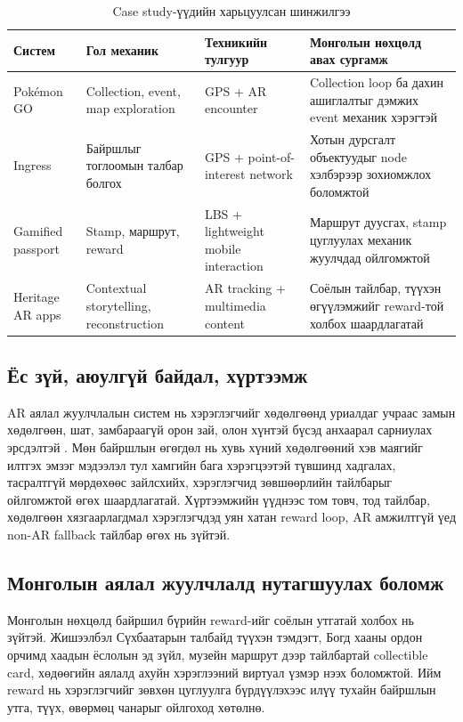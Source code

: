\begin{sloppy}
\begin{table}[H]
\centering
\caption{Case study-үүдийн харьцуулсан шинжилгээ}
\label{tab:case-studies}
\begin{tabular}{|p{3cm}|p{3cm}|p{3cm}|p{4cm}|}
\hline
\textbf{Систем} & \textbf{Гол механик} & \textbf{Техникийн тулгуур} & \textbf{Монголын нөхцөлд авах сургамж} \\ \hline
Pok\'emon GO & Collection, event, map exploration & GPS + AR encounter & Collection loop ба дахин ашиглалтыг дэмжих event механик хэрэгтэй \\ \hline
Ingress & Байршлыг тоглоомын талбар болгох & GPS + point-of-interest network & Хотын дурсгалт объектуудыг node хэлбэрээр зохиомжлох боломжтой \\ \hline
Gamified passport & Stamp, маршрут, reward & LBS + lightweight mobile interaction & Маршрут дуусгах, stamp цуглуулах механик жуулчдад ойлгомжтой \\ \hline
Heritage AR apps & Contextual storytelling, reconstruction & AR tracking + multimedia content & Соёлын тайлбар, түүхэн өгүүлэмжийг reward-той холбох шаардлагатай \\ \hline
\end{tabular}
\end{table}

\subsection{Ёс зүй, аюулгүй байдал, хүртээмж}

AR аялал жуулчлалын систем нь хэрэглэгчийг хөдөлгөөнд уриалдаг учраас замын хөдөлгөөн, шат, замбараагүй орон зай, олон хүнтэй бүсэд анхаарал сарниулах эрсдэлтэй \cite{Kounavis2012TourismAR}. Мөн байршлын өгөгдөл нь хувь хүний хөдөлгөөний хэв маягийг илтгэх эмзэг мэдээлэл тул хамгийн бага хэрэгцээтэй түвшинд хадгалах, тасралтгүй мөрдөхөөс зайлсхийх, хэрэглэгчид зөвшөөрлийн тайлбарыг ойлгомжтой өгөх шаардлагатай. Хүртээмжийн үүднээс том товч, тод тайлбар, хөдөлгөөн хязгаарлагдмал хэрэглэгчдэд уян хатан reward loop, AR амжилтгүй үед non-AR fallback тайлбар өгөх нь зүйтэй.

\subsection{Монголын аялал жуулчлалд нутагшуулах боломж}

Монголын нөхцөлд байршил бүрийн reward-ийг соёлын утгатай холбох нь зүйтэй. Жишээлбэл Сүхбаатарын талбайд түүхэн тэмдэгт, Богд хааны ордон орчимд хаадын ёслолын эд зүйл, музейн маршрут дээр тайлбартай collectible card, хөдөөгийн аялалд ахуйн хэрэглээний виртуал үзмэр нээх боломжтой. Ийм reward нь хэрэглэгчийг зөвхөн цуглуулга бүрдүүлэхээс илүү тухайн байршлын утга, түүх, өвөрмөц чанарыг ойлгоход хөтөлнө.


\end{sloppy}
